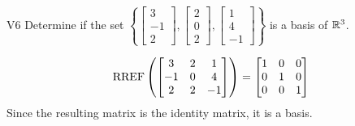 \begin{problem}{V6}
  Determine if the set \(\left\{
    \begin{bmatrix} 3 \\ -1 \\ 2 \end{bmatrix},
    \begin{bmatrix} 2 \\ 0 \\ 2 \end{bmatrix},
    \begin{bmatrix} 1 \\ 4 \\ -1 \end{bmatrix}
  \right\}\) is a basis of \(\mathbb{R}^3\).
\end{problem}
\begin{solution}
  \[\operatorname{RREF}\left(
    \begin{bmatrix}
      3 & 2 & 1 \\
      -1 & 0 & 4 \\
      2 & 2 & -1
    \end{bmatrix} \right)= \begin{bmatrix}
      1 & 0 &0 \\
      0 & 1 & 0 \\
      0 & 0 & 1
    \end{bmatrix}
  \]
Since the resulting matrix is the identity matrix, it is a basis.
\end{solution}



